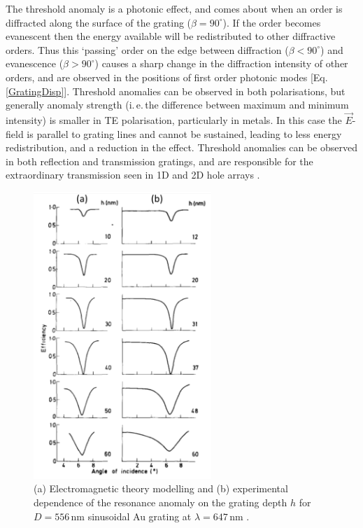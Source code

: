 The threshold anomaly is a photonic effect, and comes about when an order is diffracted along the surface of the grating ($\beta=90^{\circ}$). If the order becomes evanescent then the energy available will be redistributed to other diffractive orders. Thus this `passing' order on the edge between diffraction ($\beta<90^{\circ}$) and evanescence ($\beta>90^{\circ}$) causes a sharp change in the diffraction intensity of other orders, and are observed in the positions of first order photonic modes [Eq.\,\ref{GratingDisp}]. Threshold anomalies can be observed in both polarisations, but generally anomaly strength (i.\,e.\,the difference between maximum and minimum intensity) is smaller in TE polarisation, particularly in metals. In this case the $\vec{E}$-field is parallel to grating lines and cannot be sustained, leading to less energy redistribution, and a reduction in the effect. Threshold anomalies can be observed in both reflection and transmission gratings, and are responsible for the extraordinary transmission seen in 1D and 2D hole arrays \cite{Fano1941, Hessel1965, Lee2005, Lochbihler1994, Ritchie1968, Treacy2002, Watts1997}.
\begin{figure}[h!] 
\centering    
\includegraphics[width=0.6\textwidth]{Fig5}
\caption{(a) Electromagnetic theory modelling and (b) experimental dependence of the resonance anomaly on the grating depth $h$ for $D=556$\,nm sinusoidal Au grating at $\lambda=647$\,nm \cite{Hutley1976}. }
\label{3Fig5}
\end{figure}

